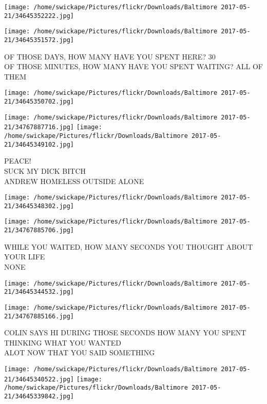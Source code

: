 \documentclass[10pt,letterpaper]{article}
\begin{document}
\texttt{[image: /home/swickape/Pictures/flickr/Downloads/Baltimore 2017-05-21/34645352222.jpg]}

\vspace{0.25in}
\texttt{[image: /home/swickape/Pictures/flickr/Downloads/Baltimore 2017-05-21/34645351572.jpg]}

OF THOSE DAYS, HOW MANY HAVE YOU SPENT HERE?  30\\
OF THOSE MINUTES, HOW MANY HAVE YOU SPENT WAITING?  ALL OF THEM
\pagebreak

\texttt{[image: /home/swickape/Pictures/flickr/Downloads/Baltimore 2017-05-21/34645350702.jpg]}

\vspace{0.25in}
\texttt{[image: /home/swickape/Pictures/flickr/Downloads/Baltimore 2017-05-21/34767887716.jpg]}
\texttt{[image: /home/swickape/Pictures/flickr/Downloads/Baltimore 2017-05-21/34645349102.jpg]}

PEACE!\\
SUCK MY DICK BITCH\\
ANDREW HOMELESS OUTSIDE ALONE
\pagebreak

\texttt{[image: /home/swickape/Pictures/flickr/Downloads/Baltimore 2017-05-21/34645348302.jpg]}

\vspace{0.25in}
\texttt{[image: /home/swickape/Pictures/flickr/Downloads/Baltimore 2017-05-21/34767885706.jpg]}

WHILE YOU WAITED, HOW MANY SECONDS YOU THOUGHT ABOUT YOUR LIFE\\
NONE
\pagebreak

\texttt{[image: /home/swickape/Pictures/flickr/Downloads/Baltimore 2017-05-21/34645344532.jpg]}

\vspace{0.25in}
\texttt{[image: /home/swickape/Pictures/flickr/Downloads/Baltimore 2017-05-21/34767885166.jpg]}

COLIN SAYS HI DURING THOSE SECONDS HOW MANY YOU SPENT THINKING WHAT YOU WANTED\\
ALOT NOW THAT YOU SAID SOMETHING
\pagebreak

\texttt{[image: /home/swickape/Pictures/flickr/Downloads/Baltimore 2017-05-21/34645340522.jpg]}
\texttt{[image: /home/swickape/Pictures/flickr/Downloads/Baltimore 2017-05-21/34645339842.jpg]}
\end{document}
